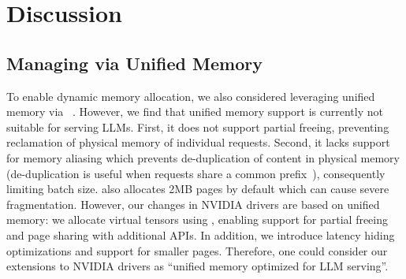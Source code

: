 \section{Discussion}
\label{sec:discussion}





\subsection{Managing \kvcache via Unified Memory}

To enable dynamic memory allocation, we also considered leveraging unified memory via \cudamallocmanaged~\cite{nvidia-cuda,gpu-mismanaged}. However, we find that unified memory support is currently not suitable for serving LLMs. First, it does not support partial freeing, preventing reclamation of physical memory of individual requests. Second, it lacks support for memory aliasing which prevents de-duplication of \kvcache content in physical memory (de-duplication is useful when requests share a common prefix~\cite{vllmsosp}), consequently limiting batch size. \cudamallocmanaged also allocates 2MB pages by default which can cause severe fragmentation. However, our changes in NVIDIA drivers are based on unified memory: we allocate virtual tensors using \cudamallocmanaged, enabling support for partial freeing and page sharing with additional APIs. In addition, we introduce latency hiding optimizations and support for smaller pages. Therefore, one could consider our extensions to NVIDIA drivers as ``unified memory optimized for LLM serving''.

\begin{table}[t!]
\caption{\kvcache block size with and without tensor slicing with 2MB pages.}
\label{table:eval:megacache:blocksize}
\end{table}


